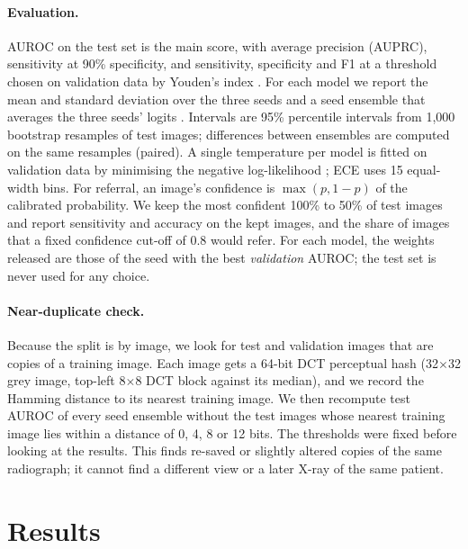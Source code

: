 \documentclass[11pt,a4paper]{article}
\begin{document}
\paragraph{Evaluation.} AUROC on the test set is the main score, with average precision (AUPRC), sensitivity at 90\%
specificity, and sensitivity, specificity and F1 at a threshold chosen on validation data by Youden's index
\citep{youden1950}. For each model we report the mean and standard deviation over the three seeds and a seed
ensemble that averages the three seeds' logits \citep{lakshminarayanan2017ensembles}. Intervals are 95\% percentile
intervals from 1,000 bootstrap resamples of test images; differences between ensembles are computed on the same
resamples (paired). A single temperature per model is fitted on validation data by minimising the negative
log-likelihood \citep{guo2017calibration}; ECE uses 15 equal-width bins. For referral, an image's confidence is
$\max(p, 1-p)$ of the calibrated probability. We keep the most confident 100\% to 50\% of test images and report
sensitivity and accuracy on the kept images, and the share of images that a fixed confidence cut-off of 0.8 would
refer. For each model, the weights released are those of the seed with the best \emph{validation} AUROC; the test set
is never used for any choice.

\paragraph{Near-duplicate check.} Because the split is by image, we look for test and validation images that are
copies of a training image. Each image gets a 64-bit DCT perceptual hash (32$\times$32 grey image, top-left
8$\times$8 DCT block against its median), and we record the Hamming distance to its nearest training image. We then
recompute test AUROC of every seed ensemble without the test images whose nearest training image lies within a
distance of 0, 4, 8 or 12 bits. The thresholds were fixed before looking at the results. This finds re-saved or
slightly altered copies of the same radiograph; it cannot find a different view or a later X-ray of the same patient.

\section{Results}
\end{document}
